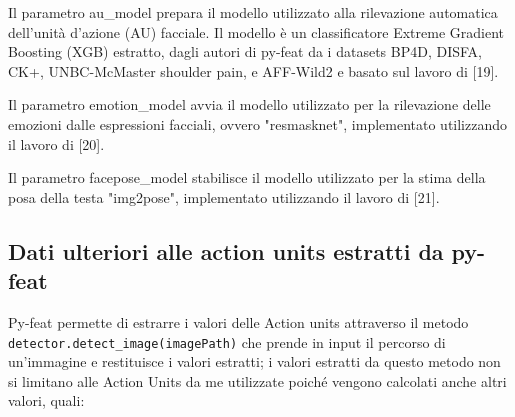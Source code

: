 Il parametro au\_model prepara il modello utilizzato alla rilevazione automatica dell'unità d'azione (AU) facciale. Il modello è un classificatore Extreme Gradient Boosting (XGB) estratto, dagli autori di py-feat da i datasets BP4D, DISFA, CK+, UNBC-McMaster shoulder pain, e AFF-Wild2 e basato sul lavoro di [19].

Il parametro emotion\_model avvia il modello utilizzato per la rilevazione delle emozioni dalle espressioni facciali, ovvero "resmasknet", implementato utilizzando il lavoro di [20].

Il parametro facepose\_model stabilisce il modello utilizzato per la stima della posa della testa "img2pose", implementato utilizzando il lavoro di [21].

\subsection{Dati ulteriori alle action units estratti da py-feat}
Py-feat permette di estrarre i valori delle Action units attraverso il metodo \texttt{detector.detect_image(imagePath)} che prende in input il percorso di un’immagine e restituisce i valori estratti; i valori estratti da questo metodo non si limitano alle Action Units da me utilizzate poiché vengono calcolati anche altri valori, quali:

